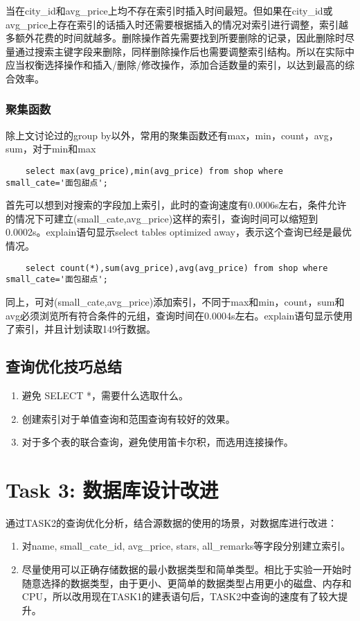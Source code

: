 \documentclass[a4paper, 11pt, nofonts, nocap, fancyhdr]{ctexart}
\begin{document}
当在city_id和avg_price上均不存在索引时插入时间最短。但如果在city_id或avg_price上存在索引的话插入时还需要根据插入的情况对索引进行调整，索引越多额外花费的时间就越多。删除操作首先需要找到所要删除的记录，因此删除时尽量通过搜索主键字段来删除，同样删除操作后也需要调整索引结构。所以在实际中应当权衡选择操作和插入/删除/修改操作，添加合适数量的索引，以达到最高的综合效率。

\subsubsection{聚集函数}
	
除上文讨论过的group by以外，常用的聚集函数还有max，min，count，avg，sum，对于min和max

	\begin{lstlisting}
	select max(avg_price),min(avg_price) from shop where small_cate='面包甜点';
	\end{lstlisting}

首先可以想到对搜索的字段加上索引，此时的查询速度有0.0006s左右，条件允许的情况下可建立(small_cate,avg_price)这样的索引，查询时间可以缩短到0.0002s。explain语句显示select tables optimized away，表示这个查询已经是最优情况。

	\begin{lstlisting}
	select count(*),sum(avg_price),avg(avg_price) from shop where small_cate='面包甜点';
	\end{lstlisting}

同上，可对(small_cate,avg_price)添加索引，不同于max和min，count，sum和avg必须浏览所有符合条件的元组，查询时间在0.0004s左右。explain语句显示使用了索引，并且计划读取149行数据。

\subsection{查询优化技巧总结}

\begin{enumerate}
	\item 避免 SELECT *，需要什么选取什么。
	\item 创建索引对于单值查询和范围查询有较好的效果。
	\item 对于多个表的联合查询，避免使用笛卡尔积，而选用连接操作。
\end{enumerate}

\section{Task 3: 数据库设计改进}

通过TASK2的查询优化分析，结合源数据的使用的场景，对数据库进行改进：

\begin{enumerate}
	\item 对name, small_cate_id, avg_price, stars, all_remarks等字段分别建立索引。
	\item 尽量使用可以正确存储数据的最小数据类型和简单类型。相比于实验一开始时随意选择的数据类型，由于更小、更简单的数据类型占用更小的磁盘、内存和CPU，所以改用现在TASK1的建表语句后，TASK2中查询的速度有了较大提升。
\end{enumerate}
\end{document}
